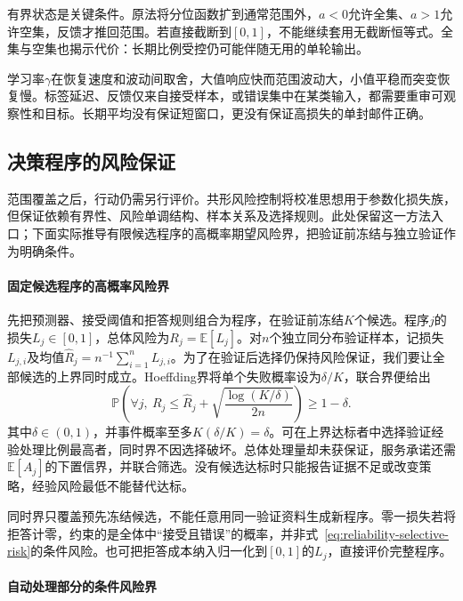 有界状态是关键条件。原法将分位函数扩到通常范围外，$a<0$允许全集、$a>1$允许空集，反馈才推回范围。若直接截断到$[0,1]$，不能继续套用无截断恒等式。全集与空集也揭示代价：长期比例受控仍可能伴随无用的单轮输出。

学习率$\gamma$在恢复速度和波动间取舍，大值响应快而范围波动大，小值平稳而突变恢复慢。标签延迟、反馈仅来自接受样本，或错误集中在某类输入，都需要重审可观察性和目标。长期平均没有保证短窗口，更没有保证高损失的单封邮件正确。

\subsection{决策程序的风险保证}

范围覆盖之后，行动仍需另行评价。共形风险控制将校准思想用于参数化损失族，但保证依赖有界性、风险单调结构、样本关系及选择规则。此处保留这一方法入口；下面实际推导有限候选程序的高概率期望风险界，把验证前冻结与独立验证作为明确条件。

\paragraph{固定候选程序的高概率风险界}

先把预测器、接受阈值和拒答规则组合为程序，在验证前冻结$K$个候选。程序$j$的损失$L_j\in[0,1]$，总体风险为$R_j=\mathbb E[L_j]$。对$n$个独立同分布验证样本，记损失$L_{j,i}$及均值$\hat R_j=n^{-1}\sum_{i=1}^{n}L_{j,i}$。为了在验证后选择仍保持风险保证，我们要让全部候选的上界同时成立。Hoeffding界将单个失败概率设为$\delta/K$，联合界便给出
\begin{equation}
 \mathbb P\left(
  \forall j,\ R_j\leq
  \hat R_j+\sqrt{\frac{\log(K/\delta)}{2n}}
 \right)\geq1-\delta.
 \label{eq:reliability-finite-program-bound}
\end{equation}
其中$\delta\in(0,1)$，并事件概率至多$K(\delta/K)=\delta$。可在上界达标者中选择验证经验处理比例最高者，同时界不因选择破坏。总体处理量却未获保证，服务承诺还需$\mathbb E[A_j]$的下置信界，并联合筛选。没有候选达标时只能报告证据不足或改变策略，经验风险最低不能替代达标。

同时界只覆盖预先冻结候选，不能任意用同一验证资料生成新程序。零一损失若将拒答计零，约束的是全体中“接受且错误”的概率，并非式~\eqref{eq:reliability-selective-risk}的条件风险。也可把拒答成本纳入归一化到$[0,1]$的$L_j$，直接评价完整程序。

\paragraph{自动处理部分的条件风险界}

